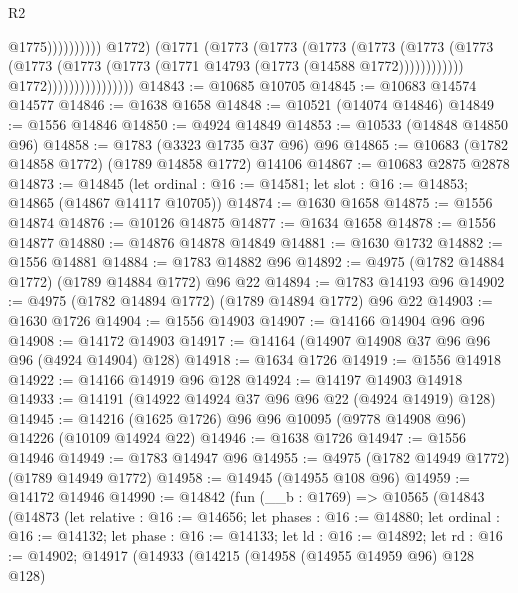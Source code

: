 \begin{lexlean}{R2}
\begin{coremodule}
                                                        @1775))))))))))
                                    @1772)
                                  (@1771
                                    (@1773
                                      (@1773
                                        (@1773
                                          (@1773
                                            (@1773
                                              (@1773
                                                (@1773
                                                  (@1773
                                                    (@1773
                                                      (@1771 @14793 (@1773 (@14588 @1772))))))))))))
                                    @1772))))))))))))))))
@14843 := @10685 @10705
@14845 := @10683 @14574 @14577
@14846 := @1638 @1658
@14848 := @10521 (@14074 @14846)
@14849 := @1556 @14846
@14850 := @4924 @14849
@14853 := @10533 (@14848 @14850 @96)
@14858 := @1783 (@3323 @1735 @37 @96) @96
@14865 := @10683 (@1782 @14858 @1772) (@1789 @14858 @1772) @14106
@14867 := @10683 @2875 @2878
@14873 := @14845
    (let ordinal : @16 := @14581; let slot : @16 := @14853; @14865 (@14867 @14117 @10705))
@14874 := @1630 @1658
@14875 := @1556 @14874
@14876 := @10126 @14875
@14877 := @1634 @1658
@14878 := @1556 @14877
@14880 := @14876 @14878 @14849
@14881 := @1630 @1732
@14882 := @1556 @14881
@14884 := @1783 @14882 @96
@14892 := @4975 (@1782 @14884 @1772) (@1789 @14884 @1772) @96 @22
@14894 := @1783 @14193 @96
@14902 := @4975 (@1782 @14894 @1772) (@1789 @14894 @1772) @96 @22
@14903 := @1630 @1726
@14904 := @1556 @14903
@14907 := @14166 @14904 @96 @96
@14908 := @14172 @14903
@14917 := @14164 (@14907 @14908 @37 @96 @96 @96 (@4924 @14904) @128)
@14918 := @1634 @1726
@14919 := @1556 @14918
@14922 := @14166 @14919 @96 @128
@14924 := @14197 @14903 @14918
@14933 := @14191 (@14922 @14924 @37 @96 @96 @22 (@4924 @14919) @128)
@14945 := @14216 (@1625 @1726) @96 @96 @10095 (@9778 @14908 @96) @14226 (@10109 @14924 @22)
@14946 := @1638 @1726
@14947 := @1556 @14946
@14949 := @1783 @14947 @96
@14955 := @4975 (@1782 @14949 @1772) (@1789 @14949 @1772)
@14958 := @14945 (@14955 @108 @96)
@14959 := @14172 @14946
@14990 := @14842
    (fun (__b : @1769) =>
    @10565
      (@14843
        (@14873
          (let relative : @16 := @14656;
          let phases : @16 := @14880;
          let ordinal : @16 := @14132;
          let phase : @16 := @14133;
          let ld : @16 := @14892;
          let rd : @16 := @14902;
          @14917
            (@14933
              (@14215
                (@14958 (@14955 @14959 @96) @128 @128)

\end{coremodule}
\end{lexlean}
